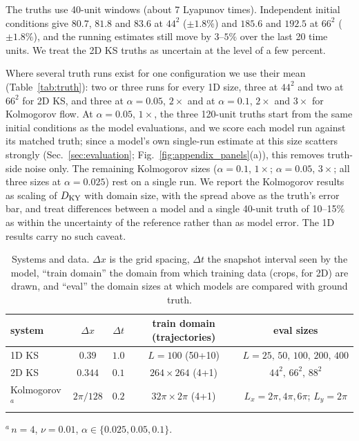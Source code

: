  The truths use 40-unit windows (about 7 Lyapunov times).
Independent initial conditions give $80.7$, $81.8$ and $83.6$ at $44^2$
($\pm1.8\%$) and $185.6$ and $192.5$ at $66^2$ ($\pm1.8\%$), and the running
estimates still move by $3$--$5\%$ over the last 20 time units. We treat
the 2D KS truths as uncertain at the level of a few percent.

 Where several truth runs exist
for one configuration we use their mean (Table~\ref{tab:truth}): two or
three runs for every 1D size, three at $44^2$ and two at $66^2$ for 2D KS,
and three at $\alpha=0.05$, $2\times$ and at $\alpha=0.1$, $2\times$ and
$3\times$ for Kolmogorov flow.
At $\alpha=0.05$, $1\times$, the three 120-unit truths start from the
same initial conditions as the model evaluations, and we score each
model run against its matched truth; since a model's own single-run
estimate at this size scatters strongly (Sec.~\ref{sec:evaluation};
Fig.~\ref{fig:appendix_panels}(a)), this removes truth-side noise only. The remaining Kolmogorov sizes
($\alpha=0.1$, $1\times$; $\alpha=0.05$, $3\times$; all three sizes at
$\alpha=0.025$) rest on a single run. We report the Kolmogorov results as scaling of $D_{\mathrm{KY}}$ with
domain size, with the spread above as the truth's error bar, and treat
differences between a model and a single 40-unit truth of 10--15\% as
within the uncertainty of the reference rather than as model error. The
1D results carry no such caveat.

\begin{table}[htbp]
\caption{Systems and data. $\Delta x$ is the grid spacing,
$\Delta t$ the snapshot interval seen by the model, ``train domain'' the
domain from which training data (crops, for 2D) are drawn, and ``eval''
the domain sizes at which models are compared with ground truth.}
\label{tab:systems}
\begin{ruledtabular}
\begin{tabular}{lcccc}
system & $\Delta x$ & $\Delta t$ & train domain (trajectories) & eval sizes \\
\hline
1D KS & $0.39$ & $1.0$ & $L=100$ (50+10) & $L=25,\,50,\,100,\,200,\,400$ \\
2D KS & $0.344$ & $0.1$ & $264\times264$ (4+1) & $44^2,\,66^2,\,88^2$ \\
Kolmogorov$^{a}$ & $2\pi/128$ & $0.2$ & $32\pi\times2\pi$ (4+1) & $L_x=2\pi,4\pi,6\pi$; $L_y=2\pi$ \\
\end{tabular}
\end{ruledtabular}
\footnotesize{$^{a}$\,$n=4$, $\nu=0.01$, $\alpha\in\{0.025,0.05,0.1\}$.}
\end{table}

